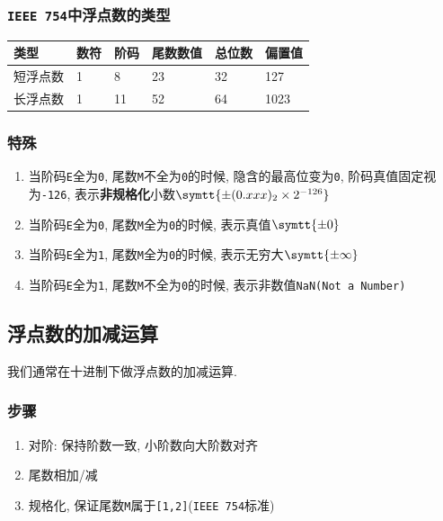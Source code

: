 \subsubsection{\texttt{IEEE 754}中浮点数的类型}
\begin{table}[H]
\centering
\begin{tabularx}{\textwidth}{|Z|Z|Z|Z|Z|Z|}
\hline
\textbf{类型} & \textbf{数符} & \textbf{阶码} & \textbf{尾数数值} & \textbf{总位数} & \textbf{偏置值} \\ \hline
短浮点数 & 1 & 8 & 23 & 32 & 127 \\ \hline
长浮点数 & 1 & 11 & 52 & 64 & 1023 \\
\hline
\end{tabularx}
\end{table} \par
\subsubsection{特殊}
\begin{enumerate}\label{特殊用途}
\item 当阶码\verb|E|全为\verb|0|, 尾数\verb|M|不全为\verb|0|的时候, 隐含的最高位变为\verb|0|, 阶码真值固定视为\verb|-126|, 表示\textbf{非规格化}小数$ \symtt{\pm(0.xxx)_{2}\times 2^{-126}} $ \par
\item 当阶码\verb|E|全为\verb|0|, 尾数\verb|M|全为\verb|0|的时候, 表示真值$ \symtt{\pm 0} $
\item 当阶码\verb|E|全为\verb|1|, 尾数\verb|M|全为\verb|0|的时候, 表示无穷大$ \symtt{\pm \infty} $
\item 当阶码\verb|E|全为\verb|1|, 尾数\verb|M|不全为\verb|0|的时候, 表示非数值\verb|NaN(Not a Number)|
\end{enumerate}
\subsection{浮点数的加减运算}
我们通常在十进制下做浮点数的加减运算.
\subsubsection{步骤}
\begin{enumerate}
\item 对阶: 保持阶数一致, 小阶数向大阶数对齐
\item 尾数相加/减
\item 规格化, 保证尾数\verb|M|属于\verb|[1,2]|(\verb|IEEE 754|标准)
\end{enumerate}
